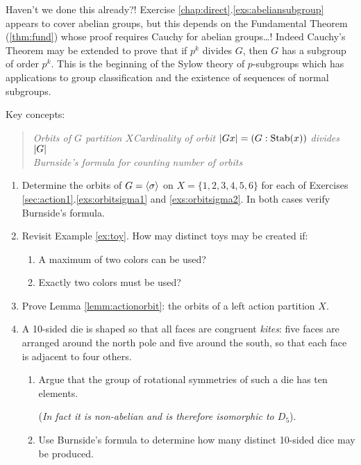 Haven't we done this already?! Exercise \ref*{chap:direct}.\ref{exs:abeliansubgroup} appears to cover abelian groups, but this depends on the Fundamental Theorem (\ref{thm:fund}) whose proof requires Cauchy for abelian groups\ldots! Indeed Cauchy's Theorem may be extended to prove that if $p^k$ divides $G$, then $G$ has a subgroup of order $p^k$. This is the beginning of the Sylow theory of $p$-subgroups which has applications to group classification and the existence of sequences of normal subgroups. 


\goodbreak

\begin{exercises}{}{}
	Key concepts:
	\begin{quote}
		\emph{Orbits of $G$ partition $X$\qquad Cardinality of orbit $\left| Gx\right|=(G:\operatorname{Stab}(x))$ divides $\left| G\right|$\\
	Burnside's formula for counting number of orbits}
	\end{quote}
	
	\begin{enumerate}
	  \item Determine the orbits of $G=\left\langle \sigma\right\rangle$ on $X=\{1,2,3,4,5,6\}$ for each of Exercises \ref*{sec:action1}.\ref{exs:orbitsigma1} and \ref{exs:orbitsigma2}. In both cases verify Burnside's formula.
	  
	  
		\item Revisit Example \ref{ex:toy}. How may distinct toys may be created if:
		\begin{enumerate}
		  \item A maximum of two colors can be used?
		  \item Exactly two colors must be used?
		\end{enumerate}
		
	  
	  \item Prove Lemma \ref{lemm:actionorbit}: the orbits of a left action partition $X$.
	  
		
		\item A 10-sided die is shaped so that all faces are congruent \emph{kites}: five faces are arranged around the north pole and five around the south, so that each face is adjacent to four others.
		\begin{enumerate}
		  \item Argue that the group of rotational symmetries of such a die has ten elements.\par
		  (\emph{In fact it is non-abelian and is therefore isomorphic to $D_5$}).
		  \item Use Burnside's formula to determine how many distinct 10-sided dice may be produced.
		\end{enumerate}
		

\end{enumerate}
\end{exercises}
